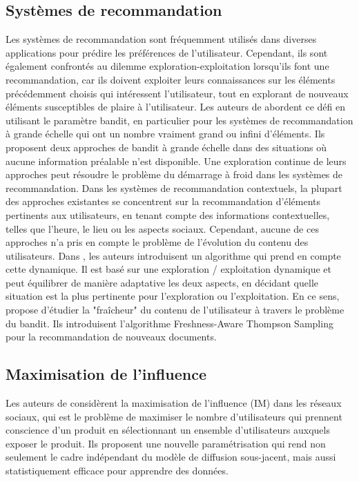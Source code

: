 \documentclass[conference]{IEEEtran}
\newcommand{\1}[1]{\mathbbm{1}_{\left\{#1\right\}}}
\begin{document}
\subsection{Systèmes de recommandation}
Les systèmes de recommandation sont fréquemment utilisés dans diverses applications pour prédire les préférences de l'utilisateur. Cependant, ils sont également confrontés au dilemme exploration-exploitation lorsqu'ils font une recommandation, car ils doivent exploiter leurs connaissances sur les éléments précédemment choisis qui intéressent l'utilisateur, tout en explorant de nouveaux éléments susceptibles de plaire à l'utilisateur. Les auteurs de \cite{zhou2017large} abordent ce défi en utilisant le paramètre bandit, en particulier pour les systèmes de recommandation à grande échelle qui ont un nombre vraiment grand ou infini d'éléments. Ils proposent deux approches de bandit à grande échelle dans des situations où aucune information préalable n'est disponible. Une exploration continue de leurs approches peut résoudre le problème du démarrage à froid dans les systèmes de recommandation. Dans les systèmes de recommandation contextuels, la plupart des approches existantes se concentrent sur la recommandation d'éléments pertinents aux utilisateurs, en tenant compte des informations contextuelles, telles que l'heure, le lieu ou les aspects sociaux. Cependant, aucune de ces approches n’a pris en compte le problème de l’évolution du contenu des utilisateurs. Dans \cite{bouneffouf2012contextual}, les auteurs introduisent un algorithme qui prend en compte cette dynamique. Il est basé sur une exploration / exploitation dynamique et peut équilibrer de manière adaptative les deux aspects, en décidant quelle situation est la plus pertinente pour l'exploration ou l'exploitation.
En ce sens, \cite{bouneffouf2014freshness} propose d'étudier la "fraîcheur" du contenu de l'utilisateur à travers le problème du bandit. Ils introduisent l'algorithme Freshness-Aware Thompson Sampling pour la recommandation de nouveaux documents.

\subsection{Maximisation de l'influence}
Les auteurs de \cite{vaswani2017model} considèrent la maximisation de l'influence (IM) dans les réseaux sociaux, qui est le problème de maximiser le nombre d'utilisateurs qui prennent conscience d'un produit en sélectionnant un ensemble d'utilisateurs auxquels exposer le produit. Ils proposent une nouvelle paramétrisation qui rend non seulement le cadre indépendant du modèle de diffusion sous-jacent, mais aussi statistiquement efficace pour apprendre des données. 
\end{document}
